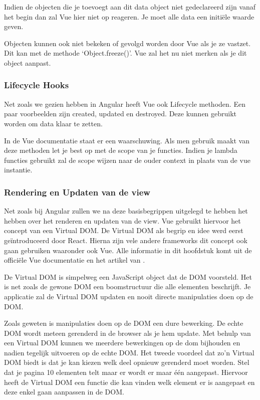Indien de objecten die je toevoegt aan dit data object niet gedeclareerd zijn vanaf het begin dan zal Vue hier niet op reageren. Je moet alle data een initiële waarde geven.

Objecten kunnen ook niet bekeken of gevolgd worden door Vue als je ze vastzet. Dit kan met de methode ‘Object.freeze()’. Vue zal het nu niet merken als je dit object aanpast.

\subsubsection{Lifecycle Hooks}
\label{sec:Vue_Lifecycle}
Net zoals we gezien hebben in Angular heeft Vue ook Lifecycle methoden. Een paar voorbeelden zijn created, updated en destroyed. Deze kunnen gebruikt worden om data klaar te zetten.

In de Vue documentatie staat er een waarschuwing. Als men gebruik maakt van deze methoden let je best op met de scope van je functies. Indien je lambda functies gebruikt zal de scope wijzen naar de ouder context in plaats van de vue instantie.

\subsubsection{Rendering en Updaten van de view}
\label{sec:Vue_Rendering_Updaten}
Net zoals bij Angular zullen we na deze basisbegrippen uitgelegd te hebben het hebben over het renderen en updaten van de view. Vue gebruikt hiervoor het concept van een Virtual DOM. De Virtual DOM als begrip en idee werd eerst geïntroduceerd door React. Hierna zijn vele andere frameworks dit concept ook gaan gebruiken waaronder ook Vue. Alle informatie in dit hoofdstuk komt uit de officiële Vue documentatie \autocite{_vue_2018-1} en het artikel van \textcite{mikami_medium_2017}.

De Virtual DOM is simpelweg een JavaScript object dat de DOM voorsteld. Het is net zoals de gewone DOM een boomstructuur die alle elementen beschrijft. Je applicatie zal de Virtual DOM updaten en nooit directe manipulaties doen op de DOM.

Zoals geweten is manipulaties doen op de DOM een dure bewerking. De echte DOM wordt meteen gerenderd in de browser als je hem update. Met behulp van een Virtual DOM kunnen we meerdere bewerkingen op de dom bijhouden en nadien tegelijk uitvoeren op de echte DOM. Het tweede voordeel dat zo’n Virtual DOM biedt is dat je kan kiezen welk deel opnieuw gerenderd moet worden. Stel dat je pagina 10 elementen telt maar er wordt er maar één aangepast. Hiervoor heeft de Virtual DOM een functie die kan vinden welk element er is aangepast en deze enkel gaan aanpassen in de DOM.

